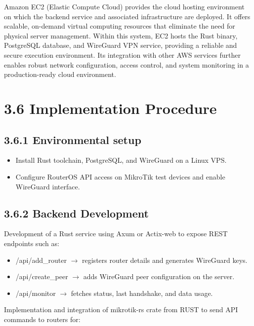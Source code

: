 \documentclass[12pt,a4paper,oneside]{report}
\begin{document}
Amazon EC2 (Elastic Compute Cloud) provides the cloud hosting environment on which the backend service and associated infrastructure are deployed. It offers scalable, on-demand virtual computing resources that eliminate the need for physical server management. Within this system, EC2 hosts the Rust binary, PostgreSQL database, and WireGuard VPN service, providing a reliable and secure execution environment. Its integration with other AWS services further enables robust network configuration, access control, and system monitoring in a production-ready cloud environment.








\section{3.6 Implementation Procedure}

\subsection{3.6.1 Environmental setup}

\begin{itemize}
  \item Install Rust toolchain, PostgreSQL, and WireGuard on a Linux VPS.
  \item Configure RouterOS API access on MikroTik test devices and enable WireGuard interface.
\end{itemize}

\subsection{3.6.2 Backend Development}

Development of a Rust service using Axum or Actix-web to expose REST endpoints such as:


\begin{itemize}
  \item /api/add\_router \ensuremath{\rightarrow} registers router details and generates WireGuard keys.
  \item /api/create\_peer \ensuremath{\rightarrow} adds WireGuard peer configuration on the server.
  \item /api/monitor \ensuremath{\rightarrow} fetches status, last handshake, and data usage.
\end{itemize}

Implementation and integration of mikrotik-rs crate from RUST to send API commands to routers for:
\end{document}
